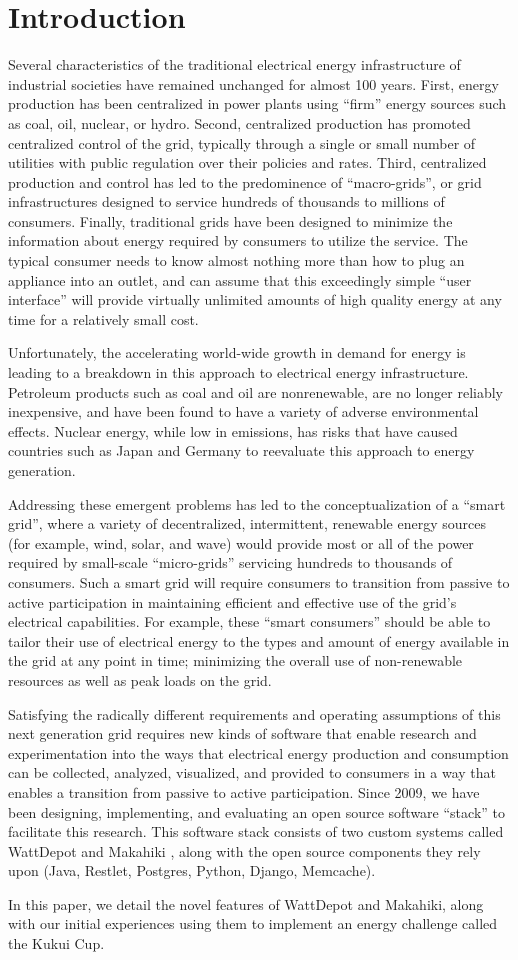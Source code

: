 \section{Introduction}
Several characteristics of the traditional electrical energy infrastructure of industrial societies have remained unchanged for almost 100 years.  First, energy production has been centralized in power plants using ``firm'' energy sources such as coal, oil, nuclear, or hydro.  Second, centralized production has promoted centralized control of the grid, typically through a single or small number of utilities with public regulation over their policies and rates.  Third, centralized production and control has led to the predominence of ``macro-grids'', or grid infrastructures designed to service hundreds of thousands to millions of consumers. Finally, traditional grids have been designed to minimize the information about energy required by consumers to utilize the service.  The typical consumer needs to know almost nothing more than how to plug an appliance into an outlet, and can assume that this exceedingly simple ``user interface'' will provide virtually unlimited amounts of high quality energy at any time for a relatively small cost.

Unfortunately, the accelerating world-wide growth in demand for energy is leading to a breakdown in this approach to electrical energy infrastructure.  Petroleum products such as coal and oil are nonrenewable, are no longer reliably inexpensive, and have been found to have a variety of adverse environmental effects.  Nuclear energy, while low in emissions, has risks that have caused countries such as Japan and Germany to reevaluate this approach to energy generation.

Addressing these emergent problems has led to the conceptualization of a ``smart grid'', where a variety of decentralized, intermittent, renewable energy sources (for example, wind, solar, and wave) would provide most or all of the power required by small-scale ``micro-grids'' servicing hundreds to thousands of consumers. Such a smart grid will require consumers to transition from passive to active participation in maintaining efficient and effective use of the grid's electrical capabilities.  For example, these ``smart consumers'' should be able to tailor their use of electrical energy to the types and amount of energy available in the grid at any point in time; minimizing the overall use of non-renewable resources as well as peak loads on the grid.

Satisfying the radically different requirements and operating assumptions of this next generation grid requires new kinds of software that enable research and experimentation into the ways that electrical energy production and consumption can be collected, analyzed, visualized, and provided to consumers in a way that enables a transition from passive to active participation.  Since 2009, we have been designing, implementing, and evaluating an open source software ``stack'' to facilitate this research.  This software stack consists of two custom systems called WattDepot \cite{WattDepotHomePage} and Makahiki \cite{MakahikiHomePage}, along with the open source components they rely upon (Java, Restlet, Postgres, Python, Django, Memcache).

In this paper, we detail the novel features of WattDepot and Makahiki,  along with our initial experiences using
them to implement an energy challenge called the Kukui Cup.
